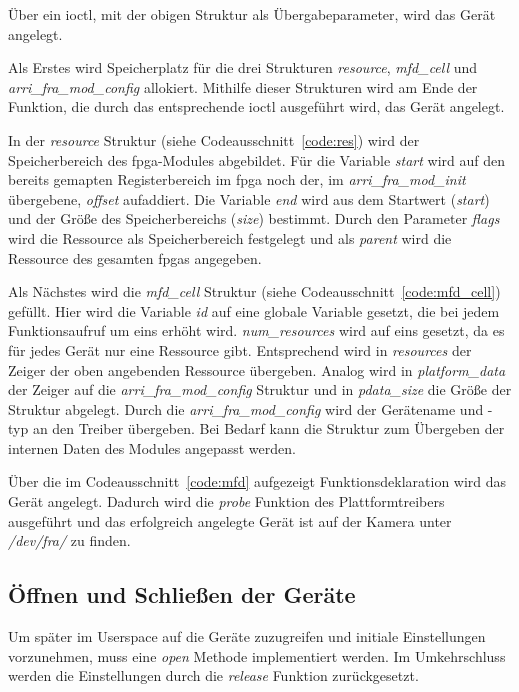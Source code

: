 Über ein \ac{ioctl}, mit der obigen Struktur als Übergabeparameter, wird das Gerät angelegt. 


Als Erstes wird Speicherplatz für die drei Strukturen \textit{resource}, \textit{mfd\_cell} und \textit{arri\_fra\_mod\_config} allokiert. Mithilfe dieser Strukturen wird am Ende der Funktion, die durch das entsprechende \ac{ioctl} ausgeführt wird, das Gerät angelegt.


In der \textit{resource} Struktur (siehe Codeausschnitt~\ref{code:res}) wird der Speicherbereich des \ac{fpga}-Modules abgebildet. Für die Variable \textit{start} wird auf den bereits gemapten Registerbereich im \ac{fpga} noch der, im \textit{arri\_fra\_mod\_init} übergebene, \textit{offset} aufaddiert. Die Variable \textit{end} wird aus dem Startwert (\textit{start}) und der Größe des Speicherbereichs (\textit{size}) bestimmt. Durch den Parameter \textit{flags} wird die Ressource als Speicherbereich festgelegt und als \textit{parent} wird die Ressource des gesamten \ac{fpga}s angegeben.


Als Nächstes wird die \textit{mfd\_cell} Struktur (siehe Codeausschnitt~\ref{code:mfd_cell}) gefüllt. Hier wird die Variable \textit{id} auf eine globale Variable gesetzt, die bei jedem Funktionsaufruf um eins erhöht wird. \textit{num\_resources} wird auf eins gesetzt, da es für jedes Gerät nur eine Ressource gibt. Entsprechend wird in  \textit{resources} der Zeiger der oben angebenden Ressource übergeben. Analog wird in \textit{platform\_data} der Zeiger auf die \textit{arri\_fra\_mod\_config} Struktur und in \textit{pdata\_size} die Größe der Struktur abgelegt.
Durch die \textit{arri\_fra\_mod\_config} wird der Gerätename und -typ an den Treiber übergeben. Bei Bedarf kann die Struktur zum Übergeben der internen Daten des Modules angepasst werden.

Über die im Codeausschnitt~\ref{code:mfd} aufgezeigt Funktionsdeklaration wird das Gerät angelegt. Dadurch wird die \textit{probe} Funktion des Plattformtreibers ausgeführt und das erfolgreich angelegte Gerät ist auf der Kamera unter \textit{/dev/fra/} zu finden.


\subsection{Öffnen und Schließen der Geräte}
Um später im Userspace auf die Geräte zuzugreifen und initiale Einstellungen vorzunehmen, muss eine \textit{open} Methode implementiert werden. Im Umkehrschluss werden die Einstellungen durch die \textit{release} Funktion zurückgesetzt. \cite[Seite 58f.]{corbet2005linux} \\

